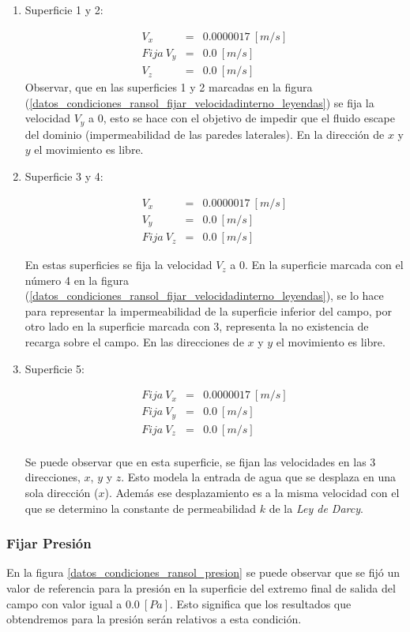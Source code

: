 \documentclass[10pt,a4paper,final]{article}
\begin{document}
\begin{enumerate}

\item Superficie 1 y 2:

\begin{eqnarray*}
V_x&=&0.0000017~[m/s]\\
Fija~V_y&=&0.0~[m/s]\\
V_z&=&0.0~[m/s]
\end{eqnarray*}
Observar, que en las superficies 1 y 2 marcadas en la figura (\ref{datos_condiciones_ransol_fijar_velocidadinterno_leyendas}) se fija la velocidad $V_y$ a $0$, esto se hace con el objetivo de impedir que el fluido escape del dominio (impermeabilidad de las paredes laterales). En la dirección de $x$ y $y$ el movimiento es libre.

\item Superficie 3 y 4:

\begin{eqnarray*}
V_x&=&0.0000017~[m/s]\\
V_y&=&0.0~[m/s]\\
Fija~V_z&=&0.0~[m/s]
\end{eqnarray*}

En estas superficies se fija la velocidad $V_z$ a $0$. En la superficie marcada con el número 4 en la figura (\ref{datos_condiciones_ransol_fijar_velocidadinterno_leyendas}), se lo hace para representar la impermeabilidad de la superficie inferior del campo, por otro lado en la superficie marcada con 3, representa la no existencia de recarga sobre el campo. En las direcciones de $x$ y $y$ el movimiento es libre.

\item Superficie 5:

\begin{eqnarray*}
Fija~V_x&=&0.0000017~[m/s]\\
Fija~V_y&=&0.0~[m/s]\\
Fija~V_z&=&0.0~[m/s]\\
\end{eqnarray*}

Se puede observar que en esta superficie, se fijan las velocidades en las 3 direcciones, $x$, $y$ y $z$. Esto modela la entrada de agua que se desplaza en una sola dirección ($x$). Además ese desplazamiento es a la misma velocidad con el que se determino la constante de permeabilidad $k$ de la \emph{Ley de Darcy}.

\end{enumerate}
\subsubsection*{Fijar Presión}
En la figura \ref{datos_condiciones_ransol_presion} se puede observar que se fijó un valor de referencia para la presión en la superficie del extremo final de salida del campo con valor igual a $0.0~\left[Pa\right]$. Esto significa que los resultados que obtendremos para la presión serán relativos a esta condición.
\end{document}
